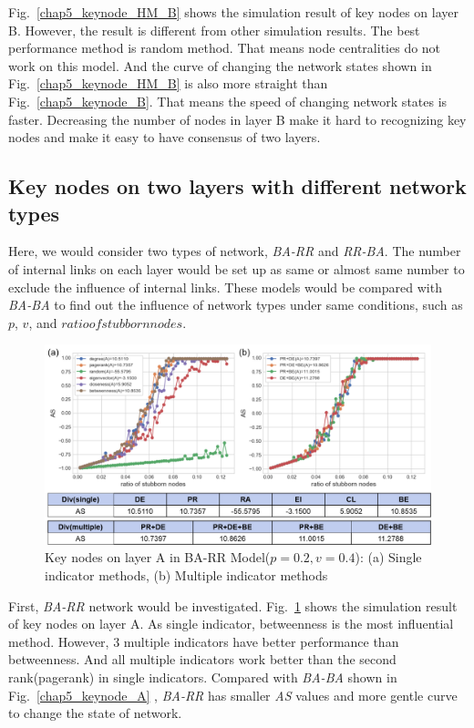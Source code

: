 Fig.~\ref{chap5_keynode_HM_B} shows the simulation result of key nodes on layer B. However, the result is different from other simulation results. The best performance method is random method. That means node centralities do not work on this model. And the curve of changing the network states shown in Fig.~\ref{chap5_keynode_HM_B} is also more straight than Fig.~\ref{chap5_keynode_B}. That means the speed of changing network states is faster. Decreasing the number of nodes in layer B make it hard to recognizing key nodes and make it easy to have consensus of two layers. 

\subsection{Key nodes on two layers with different network types}
Here, we would consider two types of network, \textit{BA-RR} and \textit{RR-BA}. The number of internal links on each layer would be set up as same or almost same number to exclude the influence of internal links. These models would be compared with \textit{BA-BA} to find out the influence of network types under same conditions, such as $p$, $v$, and $ratio of stubborn nodes$.  
\begin{figure}[!htb]
	\centering
	\includegraphics[width=\hsize]{figure/chap5_keynode_BA_RR_A.png}
	\caption{Key nodes on layer A in BA-RR Model($p=0.2, v=0.4$):
		(a) Single indicator methods, (b) Multiple indicator methods}
	\label{chap5_keynode_BA_RR_A}
\end{figure}
First, \textit{BA-RR} network would be investigated.
Fig.~\ref{chap5_keynode_BA_RR_A} shows the simulation result of key nodes on layer A. As single indicator, betweenness is the most influential method. However, 3 multiple indicators have better performance than betweenness. And all multiple indicators work better than the second rank(pagerank) in single indicators. Compared with \textit{BA-BA} shown in Fig.~\ref{chap5_keynode_A} , \textit{BA-RR} has smaller \textit{AS} values and more gentle curve to change the state of network.\\  




